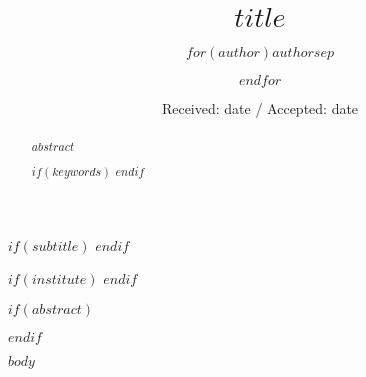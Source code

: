 \documentclass[11pt,a4paper]{article}
\begin{document}
\title{$title$}
$if(subtitle)$
$endif$

\author{$for(author)$$author$$sep$ \and $endfor$}


$if(institute)$
$endif$


\date{Received: date / Accepted: date}

\maketitle

$if(abstract)$
\begin{abstract}
$abstract$

$if(keywords)$
$endif$
\end{abstract}
$endif$

$body$

\printbibliography
\end{document}
